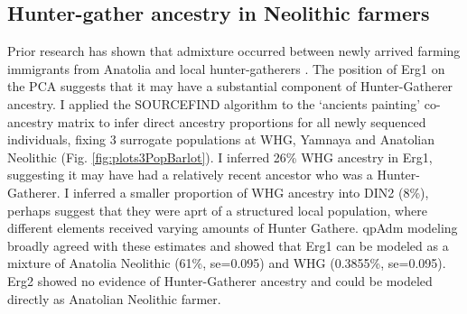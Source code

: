\subsection{Hunter-gather ancestry in Neolithic farmers}

Prior research has shown that admixture occurred between newly arrived farming immigrants from Anatolia and local hunter-gatherers \cite{Gamba2014, Lipson2017b}. The position of Erg1 on the PCA suggests that it may have a substantial component of Hunter-Gatherer ancestry. I applied the SOURCEFIND algorithm to the `ancients painting' co-ancestry matrix to infer direct ancestry proportions for all newly sequenced individuals, fixing 3 surrogate populations at WHG, Yamnaya and Anatolian Neolithic (Fig. \ref{fig:plots3PopBarlot}). I inferred 26\% WHG ancestry in Erg1, suggesting it may have had a relatively recent ancestor who was a Hunter-Gatherer. I inferred a smaller proportion of WHG ancestry into DIN2 (8\%), perhaps suggest that they were aprt of a structured local population, where different elements received varying amounts of Hunter Gathere. qpAdm modeling broadly agreed with these estimates and showed that Erg1 can be modeled as a mixture of Anatolia Neolithic (61\%, se=0.095) and WHG (0.3855\%, se=0.095).  Erg2 showed no evidence of Hunter-Gatherer ancestry and could be modeled directly as Anatolian Neolithic farmer. 

